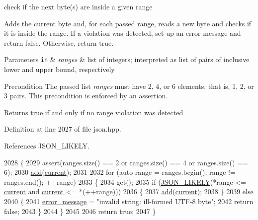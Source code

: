 check if the next byte(s) are inside a given range 

Adds the current byte and, for each passed range, reads a new byte and checks if it is inside the range. If a violation was detected, set up an error message and return false. Otherwise, return true.


\begin{DoxyParams}[1]{Parameters}
\mbox{\tt in}  & {\em ranges} & list of integers; interpreted as list of pairs of inclusive lower and upper bound, respectively\\
\hline
\end{DoxyParams}
\begin{DoxyPrecond}{Precondition}
The passed list {\itshape ranges} must have 2, 4, or 6 elements; that is, 1, 2, or 3 pairs. This precondition is enforced by an assertion.
\end{DoxyPrecond}
\begin{DoxyReturn}{Returns}
true if and only if no range violation was detected 
\end{DoxyReturn}


Definition at line 2027 of file json.\+hpp.



References J\+S\+O\+N\+\_\+\+L\+I\+K\+E\+LY.


\begin{DoxyCode}
2028     \{
2029         assert(ranges.size() == 2 or ranges.size() == 4 or ranges.size() == 6);
2030         \hyperlink{classnlohmann_1_1detail_1_1lexer_acec899d31af1fd647911e46e8535c283}{add}(\hyperlink{classnlohmann_1_1detail_1_1lexer_a47169f9aaf0da4c9885e61d3109859aa}{current});
2031 
2032         \textcolor{keywordflow}{for} (\textcolor{keyword}{auto} range = ranges.begin(); range != ranges.end(); ++range)
2033         \{
2034             \textcolor{keyword}{get}();
2035             \textcolor{keywordflow}{if} (\hyperlink{json_8hpp_a41ecd1c4cf7c3d56477b9b685b5daa72}{JSON\_LIKELY}(*range <= \hyperlink{classnlohmann_1_1detail_1_1lexer_a47169f9aaf0da4c9885e61d3109859aa}{current} and \hyperlink{classnlohmann_1_1detail_1_1lexer_a47169f9aaf0da4c9885e61d3109859aa}{current} <= *(++range)))
2036             \{
2037                 \hyperlink{classnlohmann_1_1detail_1_1lexer_acec899d31af1fd647911e46e8535c283}{add}(\hyperlink{classnlohmann_1_1detail_1_1lexer_a47169f9aaf0da4c9885e61d3109859aa}{current});
2038             \}
2039             \textcolor{keywordflow}{else}
2040             \{
2041                 \hyperlink{classnlohmann_1_1detail_1_1lexer_ae2a15e440f1889e0ab0c6a35344e48df}{error\_message} = \textcolor{stringliteral}{"invalid string: ill-formed UTF-8 byte"};
2042                 \textcolor{keywordflow}{return} \textcolor{keyword}{false};
2043             \}
2044         \}
2045 
2046         \textcolor{keywordflow}{return} \textcolor{keyword}{true};
2047     \}
\end{DoxyCode}
\mbox{\label{classnlohmann_1_1detail_1_1lexer_a33e97dee7c5faf1b36aff5b74a6c8f55}} 
